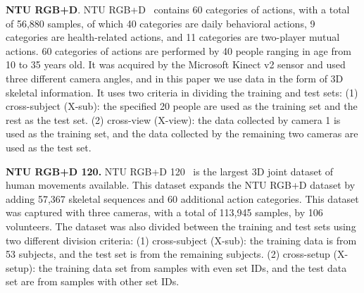 \documentclass[letterpaper]{article} \usepackage[submission]{aaai23}  \usepackage{times}  \usepackage{helvet}  \usepackage{courier}  \usepackage[hyphens]{url}  \usepackage{graphicx} \urlstyle{rm} \def\UrlFont{\rm}  \usepackage{natbib}  \usepackage{caption} \frenchspacing  \setlength{\pdfpagewidth}{8.5in} \setlength{\pdfpageheight}{11in} \usepackage{algorithm}
\begin{document}
\noindent
{\bf NTU RGB+D}. NTU RGB+D~\cite{2016NTU}  contains 60 categories of actions, with a total of 56,880 samples, of which 40 categories are daily behavioral actions, 9 categories are health-related actions, and 11 categories are two-player mutual actions. 60 categories of actions are performed by 40 people ranging in age from 10 to 35 years old. It was acquired by the Microsoft Kinect v2 sensor and used three different camera angles, and in this paper we use data in the form of 3D skeletal information. It uses two criteria in dividing the training and test sets: (1) cross-subject (X-sub): the specified 20 people are used as the training set and the rest as the test set. (2) cross-view (X-view): the data collected by camera 1 is used as the training set, and the data collected by the remaining two cameras are used as the test set.

\noindent
{\bf NTU RGB+D 120.} NTU RGB+D 120~\cite{2020NTU} is the largest 3D joint dataset of human movements available. This dataset expands the NTU RGB+D dataset by adding 57,367 skeletal sequences and 60 additional action categories. This dataset was captured with three cameras, with a total of 113,945 samples, by 106 volunteers. The dataset was also divided between the training and test sets using two different division criteria: (1) cross-subject (X-sub): the training data is from 53 subjects, and the test set is from the remaining subjects. (2) cross-setup (X-setup): the training data set from samples with even set IDs, and the test data set are from samples with other set IDs.
\end{document}
